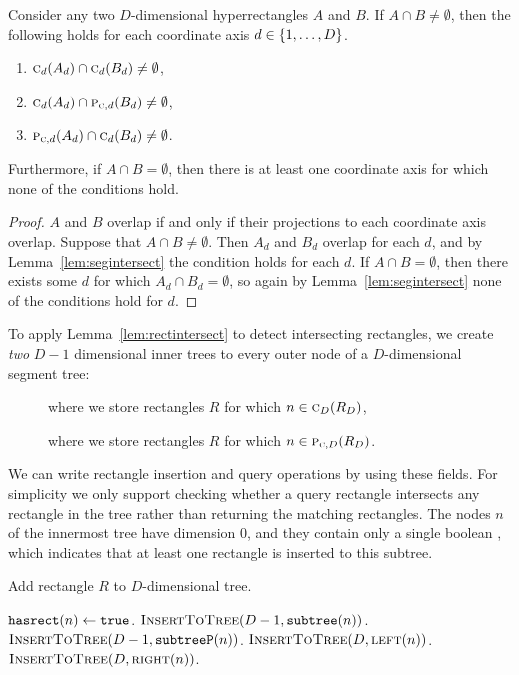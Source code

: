 \documentclass[english,gradu]{tktltiki2018}
\begin{document}
\begin{lem}\label{lem:rectintersect}Consider any two $D$-dimensional hyperrectangles $A$ and $B$.
If $A\cap B\neq\emptyset$, then the following holds for each coordinate axis $d\in\set{1,\dots,D}$.
\begin{enumerate}
\item $\canoni{A_d}{d}\cap\canoni{B_d}{d}\neq\emptyset$,
\item $\canoni{A_d}{d}\cap\canonpari{B_d}{d}\neq\emptyset$,
\item $\canonpari{A_d}{d}\cap\canoni{B_d}{d}\neq\emptyset$.
\end{enumerate}
Furthermore, if $A\cap B=\emptyset$, then there is at least one coordinate axis for which none of the conditions hold.
\end{lem}
\begin{proof}
$A$ and $B$ overlap if and only if their projections to each coordinate axis overlap.
Suppose that $A\cap B\neq\emptyset$.
Then $A_d$ and $B_d$ overlap for each $d$, and by Lemma~\ref{lem:segintersect} the condition holds for each $d$.
If $A\cap B=\emptyset$, then there exists some $d$ for which $A_d\cap B_d=\emptyset$, so again by Lemma~\ref{lem:segintersect} none of the conditions hold for $d$.
\end{proof}

To apply Lemma~\ref{lem:rectintersect} to detect intersecting rectangles, we create \emph{two} $D-1$ dimensional inner trees to every outer node of a $D$-dimensional segment tree:
\begin{description}
\item[] where we store rectangles $R$ for which $n\in\canoni{R_D}{D}$,
\item[] where we store rectangles $R$ for which $n\in\canonpari{R_D}{D}$.
\end{description}

We can write rectangle insertion and query operations by using these fields.
For simplicity we only support checking whether a query rectangle intersects any rectangle in the tree rather than returning the matching rectangles.
The nodes $n$ of the innermost tree have dimension 0, and they contain only a single boolean , which indicates that at least one rectangle is inserted to this subtree.

\begin{alg}\label{alg:rectadd}
Add rectangle $R$ to $D$-dimensional tree.
\begin{algorithmic}
		\State $\hasrect{n}\gets\texttt{true}$.
		\State $\adddt(D-1,\subtree{n})$.
		\State $\adddt(D-1,\subtreep{n})$.
		\State $\adddt(D,\leftc{n})$.
		\State $\adddt(D,\rightc{n})$.
	\EndIf
\EndProcedure
\end{algorithmic}
\end{alg}
\end{document}
